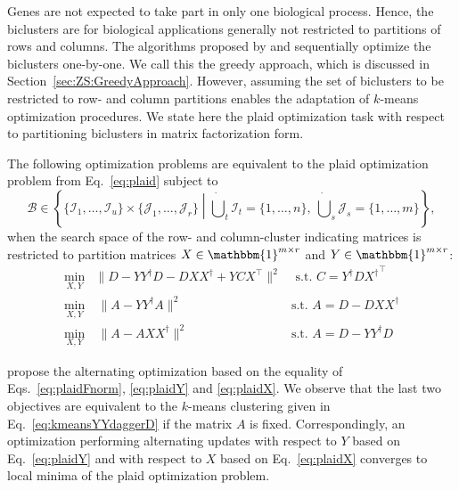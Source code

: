 Genes are not expected to take part in only one biological process. Hence, the biclusters are for biological applications generally not restricted to partitions of rows and columns. The algorithms proposed by \cite{cheng2000biclustering, lazzeroni2002plaid} and \cite{turner2005improved} sequentially optimize the biclusters one-by-one. We call this the greedy approach, which is discussed in Section~\ref{sec:ZS:GreedyApproach}. However, assuming the set of biclusters to be restricted to row- and column partitions enables the adaptation of $k$-means optimization procedures. We state here the plaid optimization task with respect to partitioning biclusters in matrix factorization form.
\begin{theorem}
The following optimization problems are equivalent to the plaid optimization problem from Eq.~\eqref{eq:plaid} subject to 
\[\mathcal{B}\in \left\{\{\mathcal{I}_1,\ldots,\mathcal{I}_u\}\times \{\mathcal{J}_1,\ldots,\mathcal{J}_r\}\middle\vert \dot\bigcup_{t}\mathcal{I}_t=\{1,\ldots,n\},\  \dot\bigcup_{s}\mathcal{J}_s=\{1,\ldots,m\}\right\},\]
when the search space of the row- and column-cluster indicating matrices is restricted to partition matrices $X\in\mathbbm{1}^{m\times r}$ and $Y\in\mathbbm{1}^{m\times r}$:
\begin{align}
    \min_{X,Y}& \bigl\lVert D-YY^\dagger D - DXX^\dagger+YCX^\top\bigr\rVert ^2  &\text{ s.t. } C=Y^\dagger D{X^\dagger}^\top\label{eq:plaidFnorm}\\
    \min_{X,Y}&\ \bigl\lVert A-YY^\dagger A\bigr\rVert ^2  &\text{s.t. } A=D-DXX^\dagger \label{eq:plaidY}\\
    \min_{X,Y}&\ \bigl\lVert A- AXX^\dagger\bigr\rVert ^2  & \text{s.t. } A=D-YY^\dagger D\label{eq:plaidX}
\end{align}
\end{theorem}
\cite{cho2004minimum} propose the alternating optimization based on the equality of Eqs.~\eqref{eq:plaidFnorm}, \eqref{eq:plaidY} and \eqref{eq:plaidX}. We observe that the last two objectives are equivalent to the $k$-means clustering given in Eq.~\eqref{eq:kmeansYYdaggerD} if the matrix $A$ is fixed. Correspondingly, an optimization performing alternating updates with respect to $Y$ based on Eq.~\eqref{eq:plaidY} and with respect to $X$ based on Eq.~\eqref{eq:plaidX} converges to local minima of the plaid optimization problem.
